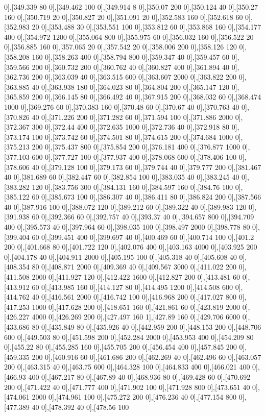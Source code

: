 {0],[349.339 80 0],[349.462 100 0],[349.914 8 0],[350.07 200 0],[350.124 40 0],[350.27 160 0],[350.719 20 0],[350.827 20 0],[351.091 20 0],[352.583 160 0],[352.618 60 0],[352.983 20 0],[353.488 30 0],[353.551 100 0],[353.812 60 0],[353.868 160 0],[354.177 400 0],[354.972 1200 0],[355.064 800 0],[355.975 60 0],[356.032 160 0],[356.522 20 0],[356.885 160 0],[357.065 20 0],[357.542 20 0],[358.006 200 0],[358.126 120 0],[358.208 160 0],[358.263 400 0],[358.794 800 0],[359.347 40 0],[359.457 60 0],[359.566 200 0],[360.732 200 0],[360.762 40 0],[360.827 400 0],[361.894 40 0],[362.736 200 0],[363.039 40 0],[363.515 600 0],[363.607 2000 0],[363.822 200 0],[363.885 40 0],[363.938 180 0],[364.023 80 0],[364.804 200 0],[365.147 120 0],[365.859 200 0],[366.145 80 0],[366.492 40 0],[367.915 200 0],[368.032 60 0],[368.474 1000 0],[369.276 60 0],[370.383 160 0],[370.48 60 0],[370.67 40 0],[370.763 40 0],[370.826 40 0],[371.226 200 0],[371.282 60 0],[371.594 100 0],[371.886 2000 0],[372.367 300 0],[372.44 400 0],[372.635 1000 0],[372.736 40 0],[372.918 80 0],[373.174 100 0],[373.742 60 0],[374.501 80 0],[374.615 200 0],[374.684 1000 0],[375.213 200 0],[375.437 800 0],[375.854 200 0],[376.181 400 0],[376.877 1000 0],[377.103 600 0],[377.727 100 0],[377.937 400 0],[378.068 600 0],[378.406 100 0],[378.606 40 0],[379.128 100 0],[379.173 60 0],[379.744 40 0],[379.777 200 0],[381.467 40 0],[381.689 60 0],[382.447 60 0],[382.854 100 0],[383.035 40 0],[383.245 40 0],[383.282 120 0],[383.756 300 0],[384.131 160 0],[384.597 160 0],[384.76 100 0],[385.122 60 0],[385.673 100 0],[386.307 40 0],[386.411 80 0],[386.824 200 0],[387.566 40 0],[387.916 100 0],[388.072 120 0],[389.212 60 0],[389.322 40 0],[389.983 120 0],[391.938 60 0],[392.366 60 0],[392.757 40 0],[393.37 40 0],[394.657 800 0],[394.709 400 0],[395.573 40 0],[397.964 60 0],[398.035 100 0],[398.497 2000 0],[398.778 80 0],[399.404 60 0],[399.451 400 0],[399.697 40 0],[400.469 60 0],[400.714 100 0],[401.2 200 0],[401.668 80 0],[401.722 120 0],[402.076 400 0],[403.163 4000 0],[403.925 200 0],[404.178 40 0],[404.911 2000 0],[405.195 100 0],[405.318 40 0],[405.608 40 0],[408.354 80 0],[408.871 2000 0],[409.369 40 0],[409.567 3000 0],[411.022 200 0],[411.508 2000 0],[411.927 120 0],[412.422 1600 0],[412.827 200 0],[413.481 60 0],[413.912 60 0],[413.985 160 0],[414.127 80 0],[414.495 1200 0],[414.508 600 0],[414.762 40 0],[416.561 2000 0],[416.742 100 0],[416.968 200 0],[417.027 800 0],[417.253 1000 0],[417.628 200 0],[418.651 160 0],[421.861 60 0],[423.819 2000 0],[426.227 4000 0],[426.269 200 0],[427.497 160 1],[427.89 160 0],[429.706 6000 0],[433.686 80 0],[435.849 80 0],[435.926 40 0],[442.959 200 0],[448.153 200 0],[448.706 600 0],[449.503 80 0],[451.598 200 0],[452.284 2000 0],[453.953 400 0],[454.209 80 0],[455.22 80 0],[455.285 160 0],[455.705 200 0],[456.454 400 0],[457.845 200 0],[459.335 200 0],[460.916 60 0],[461.686 200 0],[462.269 40 0],[462.496 60 0],[463.057 200 0],[463.315 40 0],[463.75 600 0],[464.328 100 0],[464.833 400 0],[466.021 400 0],[466.93 400 0],[467.217 80 0],[467.89 40 0],[468.936 80 0],[469.428 60 0],[470.692 200 0],[471.422 40 0],[471.777 400 0],[471.902 100 0],[471.928 800 0],[473.651 40 0],[474.061 2000 0],[474.961 100 0],[475.272 200 0],[476.236 40 0],[477.154 800 0],[477.389 40 0],[478.392 40 0],[478.56 100 }
